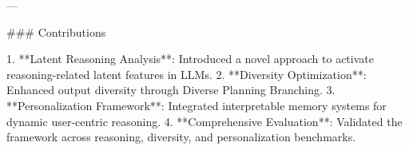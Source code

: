 ---

### Contributions

1. **Latent Reasoning Analysis**: Introduced a novel approach to activate reasoning-related latent features in LLMs.
2. **Diversity Optimization**: Enhanced output diversity through Diverse Planning Branching.
3. **Personalization Framework**: Integrated interpretable memory systems for dynamic user-centric reasoning.
4. **Comprehensive Evaluation**: Validated the framework across reasoning, diversity, and personalization benchmarks.

